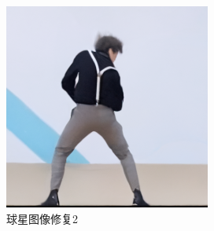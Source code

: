 \begin{figure}[H]
\begin{minipage}[b]{0.3\linewidth}
  \end{minipage}
\hspace{0.1cm}
  \begin{minipage}[b]{0.3\linewidth}
    \includegraphics[width=\linewidth]{Picture/recon/kun2_recon.png}
  \end{minipage}
  \caption{球星图像修复2}
\end{figure}


